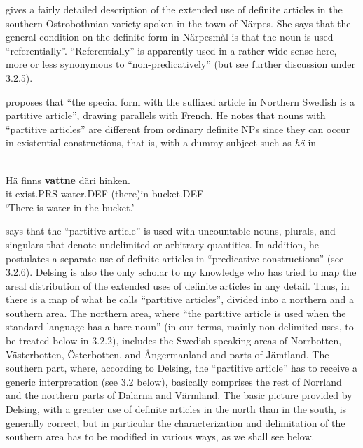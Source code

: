 
\citet{Nikula1997} gives a fairly detailed description of the extended use of definite articles in the southern Ostrobothnian variety spoken in the town of Närpes. She says that the general condition on the definite form in Närpesmål is that the noun is used “referentially”. “Referentially” is apparently used in a rather wide sense here, more or less synonymous to “non-predicatively” (but see further discussion under 3.2.5). 


\citet[50]{Delsing1993} proposes that “the special form with the suffixed article in Northern Swedish is a partitive article”, drawing parallels with French. He notes that nouns with “partitive articles” are different from ordinary definite NPs since they can occur in existential constructions, that is, with a dummy subject such as \textit{hä} in 



\ea\label{}
\\
	\gll	Hä  finns  \textbf{vattne} däri  hinken.\\
			it  exist.PRS  water.DEF  (there)in  bucket.DEF\\
			
	\glt ‘There is water in the bucket.’
\z

\citet[15]{Delsing2003a} says that the “partitive article” is used with uncountable nouns, plurals, and singulars that denote undelimited or arbitrary quantities. In addition, he postulates a separate use of definite articles in “predicative constructions” (see 3.2.6). Delsing is also the only scholar to my knowledge who has tried to map the areal distribution of the extended uses of definite articles in any detail. Thus, in \citet[18]{Delsing2003a} there is a map of what he calls “partitive articles”, divided into a northern and a southern area. The northern area, where “the partitive article is used when the standard language has a bare noun” (in our terms, mainly non-delimited uses, to be treated below in 3.2.2), includes the Swedish-speaking areas of Norrbotten, Västerbotten, Österbotten, and Ångermanland and parts of Jämtland. The southern part, where, according to Delsing, the “partitive article” has to receive a generic interpretation (see 3.2 below), basically comprises the rest of Norrland and the northern parts of Dalarna and Värmland. The basic picture provided by Delsing, with a greater use of definite articles in the north than in the south, is generally correct; but in particular the characterization and delimitation of the southern area has to be modified in various ways, as we shall see below. 


